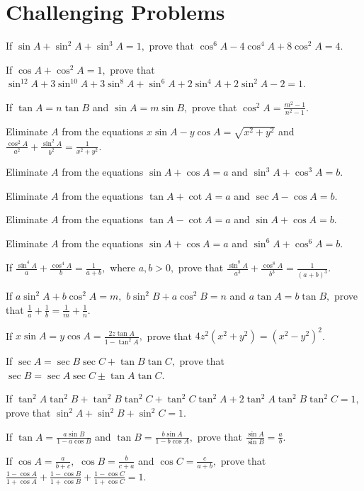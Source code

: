 \section{Challenging Problems}
\startitemize[n, 1*broad]
\item If $\sin A + \sin^2 A + \sin^3 A = 1,$ prove that $\cos^6 A - 4\cos^4 A + 8\cos^2 A = 4$.
\item If $\cos A + \cos^2 A = 1,$ prove that $\sin^{12} A + 3\sin^{10} A + 3\sin^8 A + \sin^6 A + 2\sin^4 A + 2\sin^2 A - 2 = 1$.
\item If $\tan A = n\tan B$ and $\sin A = m\sin B,$ prove that $\cos^2 A = \frac{m^2 - 1}{n^2 - 1}$.
\item Eliminate $A$ from the equations $x\sin A - y\cos A = \sqrt{x^2 + y^2}$ and $\frac{\cos^2 A}{a^2} + \frac{\sin^2 A}{b^2} =
    \frac{1}{x^2 + y^2}$.
\item Eliminate $A$ from the equations $\sin A + \cos A = a$ and $\sin^3 A + \cos^3 A = b$.
\item Eliminate $A$ from the equations $\tan A + \cot A = a$ and $\sec A - \cos A = b$.
\item Eliminate $A$ from the equations $\tan A - \cot A = a$ and $\sin A + \cos A = b$.
\item Eliminate $A$ from the equations $\sin A + \cos A = a$ and $\sin^6 A + \cos^6 A = b$.
\item If $\frac{\sin^4 A}{a} + \frac{\cos^4 A}{b} = \frac{1}{a + b},$ where $a, b > 0,$ prove that $\frac{\sin^8 A}{a^3} +
    \frac{\cos^8 A}{b^3} = \frac{1}{(a + b)^3}$.
\item If $a\sin^2 A + b\cos^2 A = m,$ $b\sin^2 B + a\cos^2 B = n$ and $a\tan A = b\tan B,$ prove that $\frac{1}{a} + \frac{1}{b} =
    \frac{1}{m} + \frac{1}{n}$.
\item If $x\sin A = y\cos A = \frac{2z\tan A}{1 - \tan^2 A},$ prove that $4z^2(x^2 + y^2) = (x^2 - y^2)^2$.
\item If $\sec A = \sec B\sec C + \tan B\tan C,$ prove that $\sec B = \sec A\sec C \pm \tan A\tan C$.
\item If $\tan^2 A\tan^2 B + \tan^2 B\tan^2 C + \tan^2 C\tan^2 A + 2\tan^2 A\tan^2 B\tan^2 C = 1,$ prove that $\sin^2 A + \sin^2 B
    + \sin^2 C = 1$.
\item If $\tan A = \frac{a\sin B}{1 - a\cos B}$ and $\tan B = \frac{b\sin A}{1 - b\cos A},$ prove that $\frac{\sin A}{\sin B} =
    \frac{a}{b}$.
\item If $\cos A = \frac{a}{b + c},$ $\cos B = \frac{b}{c + a}$ and $\cos C = \frac{c}{a + b},$ prove that $\frac{1 - \cos A}{1 +
    \cos A} + \frac{1 - \cos B}{1 + \cos B} + \frac{1 - \cos C}{1 + \cos C} = 1$.
